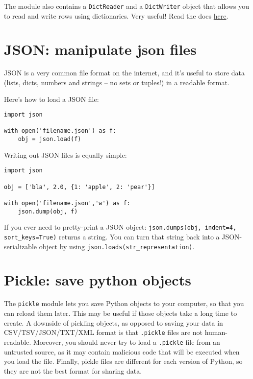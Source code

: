 \documentclass[12pt]{book}
\begin{document}
The module also contains a \texttt{DictReader} and a \texttt{DictWriter} object that allows you to read and write rows using dictionaries. Very useful!  Read the docs \href{https://docs.python.org/3.5/library/csv.html}{here}.

\section{JSON: manipulate json files}

JSON is a very common file format on the internet, and it's useful to store data (lists, dicts, numbers and strings -- no sets or tuples!) in a readable format.

Here's how to load a JSON file:

\begin{lstlisting}
import json

with open('filename.json') as f:
    obj = json.load(f)
\end{lstlisting}

Writing out JSON files is equally simple:

\begin{lstlisting}
import json

obj = ['bla', 2.0, {1: 'apple', 2: 'pear'}]

with open('filename.json','w') as f:
    json.dump(obj, f)
\end{lstlisting}

If you ever need to pretty-print a JSON object: \texttt{json.dumps(obj, indent=4, sort\_keys=True)} returns a string. You can turn that string back into a JSON-serializable object by using \texttt{json.loads(str\_representation)}.


\section{Pickle: save python objects}

The \texttt{pickle} module lets you save Python objects to your computer, so that you can reload them later. This may be useful if those objects take a long time to create. A downside of pickling objects, as opposed to saving your data in CSV/TSV/JSON/TXT/XML format is that \texttt{.pickle} files are not human-readable. Moreover, you should never try to load a \texttt{.pickle} file from an untrusted source, as it may contain malicious code that will be executed when you load the file. Finally, pickle files are different for each version of Python, so they are not the best format for sharing data.
\end{document}
